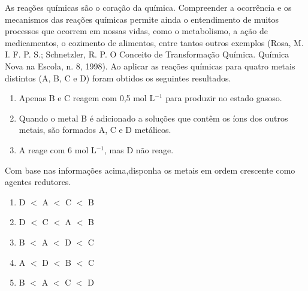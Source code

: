 As reações químicas são o coração da química. Compreender a ocorrência e os mecanismos das reações químicas permite ainda o entendimento de muitos processos que ocorrem em nossas vidas, como o metabolismo, a ação de medicamentos, o cozimento de alimentos, entre tantos outros exemplos (Rosa, M. I. F. P. S.; Schnetzler, R. P. O Conceito de Transformação Química. Química Nova na Escola, n. 8, 1998). Ao aplicar as reações químicas para quatro metais distintos (A, B, C e D) foram obtidos os seguintes resultados. 

\begin{enumerate}[label = (\alph*)]
	\item Apenas B e C reagem com  0,5 mol L$^{-1}$ para produzir  no estado gasoso.
	\item Quando o metal B é adicionado a soluções que contêm os íons dos outros metais, são formados A, C e D metálicos. 
	\item A reage com  6 mol L$^{-1}$, mas D não reage.
\end{enumerate}

Com base nas informações acima,disponha os metais em ordem crescente como agentes redutores.

\begin{enumerate}[label = (\alph*)]
	\item D $<$ A $<$ C $<$ B
	\item D $<$ C $<$ A $<$ B 
	\item B $<$ A $<$ D $<$ C 
	\item A $<$ D $<$ B $<$ C
	\item B $<$ A $<$ C $<$ D
\end{enumerate}
